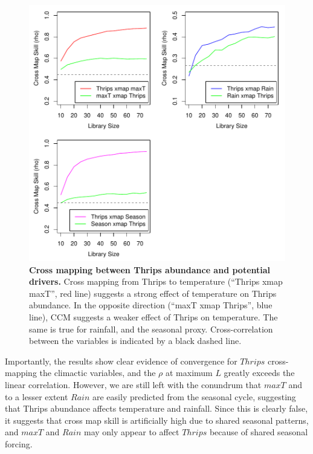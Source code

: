 \begin{figure}[!ht]
\begin{center}\includegraphics[width=\maxwidth{\textwidth}]{fig_redm_16.pdf}\end{center}
\caption[Cross mapping between Thrips abundance and potential drivers.]{\textbf{Cross mapping between Thrips abundance and potential drivers.}\newline
Cross mapping from Thrips to temperature (``Thrips xmap maxT'', red line) suggests a strong effect of temperature on Thrips abundance. In the opposite direction (``maxT xmap Thrips'', blue line), CCM suggests a weaker effect of Thrips on temperature. The same is true for rainfall, and the seasonal proxy. Cross-correlation between the variables is indicated by a black dashed line.}
\end{figure}

Importantly, the results show clear evidence of convergence for $Thrips$ cross-mapping the climactic variables, and the $\rho$ at maximum $L$ greatly exceeds the linear correlation. However, we are still left with the conundrum that $maxT$ and to a lesser extent $Rain$ are easily predicted from the seasonal cycle, suggesting that Thrips abundance affects temperature and rainfall. Since this is clearly false, it suggests that cross map skill is artificially high due to shared seasonal patterns, and $maxT$ and $Rain$ may only appear to affect $Thrips$ because of shared seasonal forcing.

